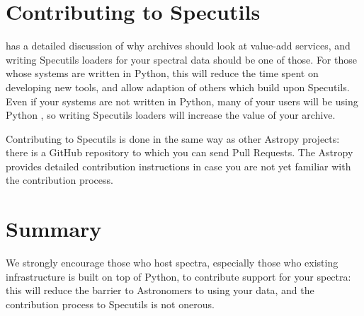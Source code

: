 \documentclass[11pt,twoside]{article}
\begin{document}
\section{Contributing to Specutils}

\citet{PID_adassxxx} has a detailed discussion of why archives should look at
value-add services, and writing Specutils loaders for your spectral data should
be one of those.  For those whose systems are written in Python, this will
reduce the time spent on developing new tools, and allow adaption of others
which build upon Specutils. Even if your systems are not written in Python, many
of your users will be using Python \citep{2015arXiv150703989M},
so writing Specutils loaders will increase the value of your archive.

Contributing to Specutils is done in the same way as other Astropy projects:
there is a GitHub repository to which you can send Pull Requests. The Astropy
provides detailed contribution instructions in case you are not yet familiar
with the contribution process.


\section{Summary}

We strongly encourage those who host spectra, especially those who existing
infrastructure is built on top of Python, to contribute support for your
spectra: this will reduce the barrier to Astronomers to using your data, and the
contribution process to Specutils is not onerous.




\end{document}

